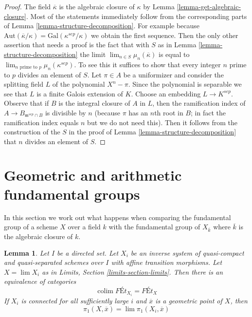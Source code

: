 \documentclass{stacks-project}
\theoremstyle{plain}
\newtheorem{lemma}[subsection]{Lemma}
\theoremstyle{definition}
\theoremstyle{remark}
\numberwithin{equation}{subsection}
\def\lim{\mathop{\mathrm{lim}}\nolimits}
\def\colim{\mathop{\mathrm{colim}}\nolimits}
\begin{document}
\begin{proof}
The field $\overline{\kappa}$ is the algebraic closure of $\kappa$ by
Lemma \ref{lemma-get-algebraic-closure}.
Most of the statements immediately follow from the corresponding
parts of Lemma \ref{lemma-structure-decomposition}. For example because
$\text{Aut}(\overline{\kappa}/\kappa) = \text{Gal}(\kappa^{sep}/\kappa)$
we obtain the first sequence.
Then the only other assertion that needs a proof is the fact that
with $S$ as in Lemma \ref{lemma-structure-decomposition} the
limit $\lim_{n \in S} \mu_n(\overline{\kappa})$ is equal to
$\lim_{n\text{ prime to }p} \mu_n(\kappa^{sep})$. To see this
it suffices to show that every integer $n$ prime to $p$
divides an element of $S$.
Let $\pi \in A$ be a uniformizer and consider the splitting
field $L$ of the polynomial $X^n - \pi$. Since the polynomial
is separable we see that $L$ is a finite Galois extension of $K$.
Choose an embedding $L \to K^{sep}$.
Observe that if $B$ is the integral closure of $A$ in $L$,
then the ramification index of $A \to B_{\mathfrak m^{sep} \cap B}$
is divisible by $n$ (because $\pi$ has an $n$th root in $B$; in fact
the ramification index equals $n$ but we do not need this).
Then it follows from the construction of the $S$ in the proof of
Lemma \ref{lemma-structure-decomposition}
that $n$ divides an element of $S$.
\end{proof}








\section{Geometric and arithmetic fundamental groups}
\label{section-galois-action}

\noindent
In this section we work out what happens when comparing the
fundamental group of a scheme $X$ over a field $k$ with the
fundamental group of $X_{\overline{k}}$ where $\overline{k}$
is the algebraic closure of $k$.

\begin{lemma}
\label{lemma-limit}
Let $I$ be a directed set. Let $X_i$ be an
inverse system of quasi-compact and quasi-separated schemes
over $I$ with affine transition morphisms.
Let $X = \lim X_i$ as in Limits, Section \ref{limits-section-limits}.
Then there is an equivalence of categories
$$
\colim \textit{F\'Et}_{X_i} = \textit{F\'Et}_X
$$
If $X_i$ is connected for all sufficiently large $i$ and $\overline{x}$
is a geometric point of $X$, then
$$
\pi_1(X, \overline{x}) = \lim \pi_1(X_i, \overline{x})
$$
\end{lemma}
\end{document}
